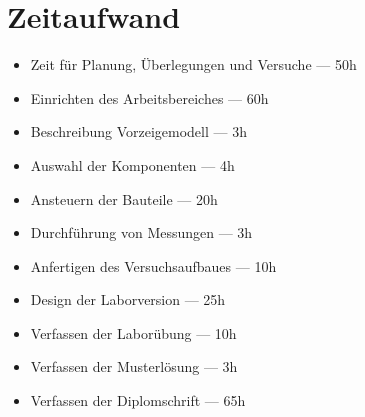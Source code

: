 \chapter*{Zeitaufwand}

\begin{itemize}
    \item Zeit für Planung, Überlegungen und Versuche --- 50h
    \item Einrichten des Arbeitsbereiches --- 60h
    \item Beschreibung Vorzeigemodell --- 3h
    \item Auswahl der Komponenten --- 4h
    \item Ansteuern der Bauteile --- 20h
    \item Durchführung von Messungen --- 3h
    \item Anfertigen des Versuchsaufbaues --- 10h
    \item Design der Laborversion --- 25h
    \item Verfassen der Laborübung --- 10h
    \item Verfassen der Musterlösung --- 3h
    \item Verfassen der Diplomschrift --- 65h %
\end{itemize}